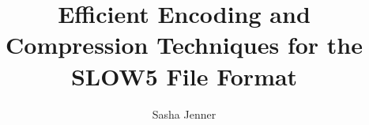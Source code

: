 \documentclass[sigconf]{acmart}
\begin{document}
\title{Efficient Encoding and Compression Techniques for the SLOW5 File Format}
\author{Sasha Jenner}



\maketitle

\tableofcontents
\listoffigures
\listoftables











\appendix

\printnomenclature
\end{document}
